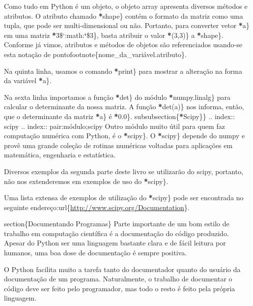 \documentclass[a4paper,10pt,brazil]{sphinxmanual}
\begin{document}
Como tudo em Python é um objeto, o objeto array apresenta diversos métodos e atributos. O atributo chamado {\color{red}\bfseries{}*}shape\} contém o formato da matriz como uma tupla, que pode ser multi-dimensional ou não. Portanto, para converter vetor {\color{red}\bfseries{}*}a\} em uma matriz {\color{red}\bfseries{}*}3\${}`:math:{\color{red}\bfseries{}{}`}\$3\}, basta atribuir o valor {\color{red}\bfseries{}*}(3,3)\} a {\color{red}\bfseries{}*}shape\}. Conforme já vimos, atributos e métodos de objetos são referenciados usando-se esta notação de pontofootnote\{nome\_da\_variável.atributo\}.

Na quinta linha, usamos o comando {\color{red}\bfseries{}*}print\} para mostrar a alteração na forma da variável {\color{red}\bfseries{}*}a\}.

Na sexta linha importamos a função {\color{red}\bfseries{}*}det\} do módulo {\color{red}\bfseries{}*}numpy.linalg\} para calcular o determinante da nossa matriz. A função {\color{red}\bfseries{}*}det(a)\} nos informa, então, que o determinante da matriz {\color{red}\bfseries{}*}a\} é {\color{red}\bfseries{}*}0.0\}.
subsubsection\{{\color{red}\bfseries{}*}Scipy\}\}
.. index:: scipy
.. index:: pair:módulo;scipy
Outro módulo muito útil para quem faz computação numérica com Python, é o {\color{red}\bfseries{}*}scipy\}. O {\color{red}\bfseries{}*}scipy\} depende do numpy e provê uma grande coleção de rotinas numéricas voltadas para aplicações em matemática, engenharia e estatística.

Diversos exemplos da segunda parte deste livro se utilizarão do scipy, portanto, não nos extenderemos em exemplos de uso do {\color{red}\bfseries{}*}scipy\}.

Uma lista extensa de exemplos de utilização do {\color{red}\bfseries{}*}scipy\} pode ser encontrada no seguinte endereço:url\{\href{http://www.scipy.org/Documentation}{http://www.scipy.org/Documentation}\}.

section\{Documentando Programas\}
Parte importante de um bom estilo de trabalho em computação científica é a documentação do código produzido. Apesar do Python ser uma linguagem bastante clara e de fácil leitura por humanos, uma boa dose de documentação é sempre positiva.

O Python facilita muito a tarefa tanto do documentador quanto do usuário da documentação de um programa. Naturalmente, o trabalho de documentar o código deve ser feito pelo programador, mas todo o resto é feito pela própria linguagem.
\end{document}
